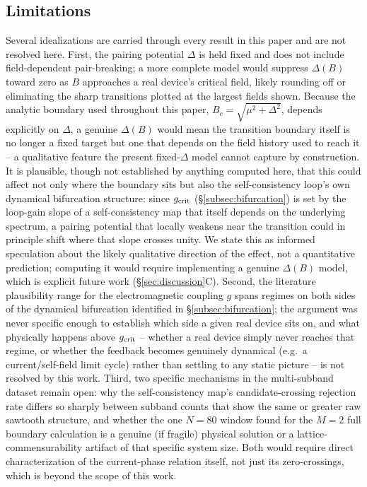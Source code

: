 \documentclass[aps,physrev,reprint,superscriptaddress,amsmath,amssymb,floatfix]{revtex4-2}
\begin{document}
\subsection{Limitations}

Several idealizations are carried through every result in this paper and
are not resolved here. First, the pairing potential $\Delta$ is held
fixed and does not include field-dependent pair-breaking; a more complete
model would suppress $\Delta(B)$ toward zero as $B$ approaches a real
device's critical field, likely rounding off or eliminating the sharp
transitions plotted at the largest fields shown. Because the analytic
boundary used throughout this paper, $B_c=\sqrt{\mu^2+\Delta^2}$, depends
explicitly on $\Delta$, a genuine $\Delta(B)$ would mean the transition
boundary itself is no longer a fixed target but one that depends on the
field history used to reach it -- a qualitative feature the present
fixed-$\Delta$ model cannot capture by construction. It is plausible,
though not established by anything computed here, that this could affect
not only where the boundary sits but also the self-consistency loop's own
dynamical bifurcation structure: since $g_{\rm crit}$
(\S\ref{subsec:bifurcation}) is set by the loop-gain slope of a
self-consistency map that itself depends on the underlying spectrum, a
pairing potential that locally weakens near the transition could in
principle shift where that slope crosses unity. We state this as informed
speculation about the likely qualitative direction of the effect, not a
quantitative prediction; computing it would require implementing a
genuine $\Delta(B)$ model, which is explicit future work
(\S\ref{sec:discussion}C). Second, the literature
plausibility range for the electromagnetic coupling $g$ spans regimes on
both sides of the dynamical bifurcation identified in
\S\ref{subsec:bifurcation}; the argument was never specific enough to establish
which side a given real device sits on, and what physically happens
above $g_{\rm crit}$ -- whether a real device simply never reaches that
regime, or whether the feedback becomes genuinely dynamical (e.g.\ a
current/self-field limit cycle) rather than settling to any static
picture -- is not resolved by this work. Third, two specific mechanisms
in the multi-subband dataset remain open: why the self-consistency map's
candidate-crossing rejection rate differs so sharply between subband
counts that show the same or greater raw sawtooth structure, and whether
the one $N=80$ window found for the $M=2$ full boundary calculation is a
genuine (if fragile) physical solution or a lattice-commensurability
artifact of that specific system size. Both would require direct
characterization of the current-phase relation itself, not just its
zero-crossings, which is beyond the scope of this work.
\end{document}
